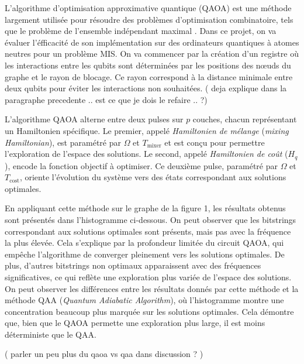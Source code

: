 \documentclass[11pt]{article}
\begin{document}
 L'algorithme d'optimisation approximative quantique (QAOA) est une méthode largement utilisée pour résoudre des problèmes d'optimisation combinatoire, tels que le problème de l'ensemble indépendant maximal \cite{farhi_quantum_2014}. Dans ce projet, on va évaluer l'éfficacité de son implémentation sur des ordinateurs quantiques à atomes neutres pour un problème MIS. On va commencer par la création d'un registre où les interactions entre les qubits sont déterminées par les positions des nœuds du graphe et le rayon de blocage. Ce rayon correspond à la distance minimale entre deux qubits pour éviter les interactions non souhaitées. ( deja explique dans la paragraphe precedente .. est ce que je dois le refaire .. ?)
 
L'algorithme QAOA alterne entre deux pulses sur \( p \) couches, chacun représentant un Hamiltonien spécifique. Le premier, appelé \textit{Hamiltonien de mélange} (\textit{mixing Hamiltonian}), est paramétré par \( \Omega \) et \( T_{\text{mixer}} \) et est conçu pour permettre l'exploration de l'espace des solutions. Le second, appelé \textit{Hamiltonien de coût} (\( H_q \)), encode la fonction objectif à optimiser. Ce deuxième pulse, paramétré par \( \Omega \) et \( T_{\text{cost}} \), oriente l'évolution du système vers des états correspondant aux solutions optimales.

En appliquant cette méthode sur le graphe de la figure 1, les résultats obtenus sont présentés dans l'histogramme ci-dessous. On peut observer que les bitstrings correspondant aux solutions optimales sont présents, mais pas avec la fréquence la plus élevée. Cela s'explique par la profondeur limitée du circuit QAOA, qui empêche l'algorithme de converger pleinement vers les solutions optimales. De plus, d'autres bitstrings non optimaux apparaissent avec des fréquences significatives, ce qui reflète une exploration plus variée de l'espace des solutions.
On peut observer les différences entre les résultats donnés par cette méthode et la méthode QAA (\textit{Quantum Adiabatic Algorithm}), où l'histogramme montre une concentration beaucoup plus marquée sur les solutions optimales. Cela démontre que, bien que le QAOA permette une exploration plus large, il est moins déterministe que le QAA.

( parler un peu plus du qaoa vs qaa dans discussion ? )
\end{document}
